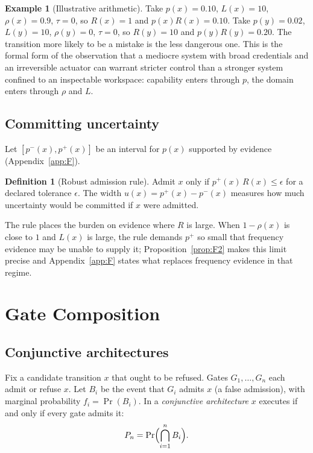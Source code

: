 \documentclass[11pt]{article}
\theoremstyle{definition}
\newtheorem{definition}[theorem]{Definition}
\newtheorem{example}[theorem]{Example}
\begin{document}
\begin{example}[Illustrative arithmetic]
Take $p(x)=0.10$, $L(x)=10$, $\rho(x)=0.9$, $\tau=0$, so $R(x)=1$ and $p(x)R(x)=0.10$. Take $p(y)=0.02$, $L(y)=10$, $\rho(y)=0$, $\tau=0$, so $R(y)=10$ and $p(y)R(y)=0.20$. The transition more likely to be a mistake is the less dangerous one. This is the formal form of the observation that a mediocre system with broad credentials and an irreversible actuator can warrant stricter control than a stronger system confined to an inspectable workspace: capability enters through $p$, the domain enters through $\rho$ and $L$.
\end{example}

\subsection{Committing uncertainty}

Let $[p^-(x),p^+(x)]$ be an interval for $p(x)$ supported by evidence (Appendix~\ref{app:F}).

\begin{definition}[Robust admission rule]
Admit $x$ only if $p^+(x)\,R(x)\le\epsilon$ for a declared tolerance $\epsilon$. The width $u(x)=p^+(x)-p^-(x)$ measures how much uncertainty would be committed if $x$ were admitted.
\end{definition}

The rule places the burden on evidence where $R$ is large. When $1-\rho(x)$ is close to $1$ and $L(x)$ is large, the rule demands $p^+$ so small that frequency evidence may be unable to supply it; Proposition~\ref{prop:F2} makes this limit precise and Appendix~\ref{app:F} states what replaces frequency evidence in that regime.

\section{Gate Composition}\label{app:E}

\subsection{Conjunctive architectures}

Fix a candidate transition $x$ that ought to be refused. Gates $G_1,\dots,G_n$ each admit or refuse $x$. Let $B_i$ be the event that $G_i$ admits $x$ (a false admission), with marginal probability $f_i=\Pr(B_i)$. In a \emph{conjunctive architecture} $x$ executes if and only if every gate admits it:
\[
P_n=\Pr\Bigl(\bigcap_{i=1}^nB_i\Bigr).
\]
\end{document}
